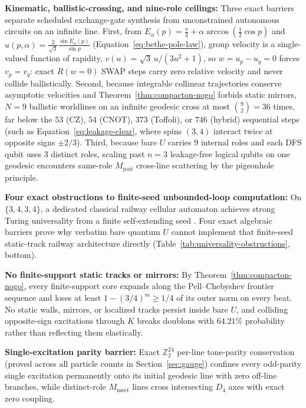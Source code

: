 \textbf{Kinematic, ballistic-crossing, and nine-role ceilings:} Three exact barriers separate scheduled exchange-gate
synthesis from unconstrained autonomous circuits on an infinite line. First, from $E_\alpha(p) = \frac{\pi}{3} + \alpha
\arccos(\frac{1}{2}\cos p)$ and $u(p, \alpha) = \frac{2}{\sqrt{3}}\frac{\sin E_\alpha(p)}{\sin p}$
(Equation~\eqref{eq:bethe-pole-law}), group velocity is a single-valued function of rapidity,
$v(u) = \sqrt{3}\, u / (3 u^2 + 1)$, so $w = u_p - u_q = 0$ forces $v_p = v_q$: exact $R(w = 0)$ SWAP steps carry zero
relative velocity and never collide ballistically. Second, because integrable collinear trajectories conserve asymptotic
velocities and Theorem~\ref{thm:compacton-nogo} forbids static mirrors, $N = 9$ ballistic worldlines on an infinite
geodesic cross at most $\binom{9}{2} = 36$ times, far below the $53$ (CZ), $54$ (CNOT), $373$ (Toffoli), or $746$
(hybrid) sequential steps (such as Equation~\eqref{eq:leakage-clear}, where spins $(3,4)$ interact twice at opposite
signs $\pm 2/3$). Third, because bare $U$ carries $9$ internal roles and each DFS qubit uses $3$ distinct roles, scaling
past $n = 3$ leakage-free logical qubits on one geodesic encounters same-role $M_{\mathrm{pair}}$ cross-line scattering
by the pigeonhole principle.

\textbf{Four exact obstructions to finite-seed unbounded-loop computation:} On $\{3,4,3,4\}$, a dedicated classical
railway cellular automaton achieves strong Turing universality from a finite self-extending seed
\cite{pollard2026railway}. Four exact algebraic barriers prove why verbatim bare quantum $U$ cannot implement that
finite-seed static-track railway architecture directly (Table~\ref{tab:universality-obstructions}, bottom).

\textbf{No finite-support static tracks or mirrors:} By Theorem~\ref{thm:compacton-nogo}, every finite-support core
expands along the Pell--Chebyshev frontier sequence and loses at least $1 - (3/4)^m \ge 1/4$ of its outer norm on every
beat. No static walls, mirrors, or localized tracks persist inside bare $U$, and colliding opposite-sign excitations
through $K$ breaks doublons with $64.21\%$ probability rather than reflecting them elastically.

\textbf{Single-excitation parity barrier:} Exact $\mathbb{Z}_2^{24}$ per-line tone-parity conservation (proved across all
particle counts in Section~\ref{sec:gauge}) confines every odd-parity single excitation permanently onto its initial
geodesic line with zero off-line branches, while distinct-role $M_{\mathrm{meet}}$ lines cross intersecting $D_4$ axes
with exact zero coupling.

